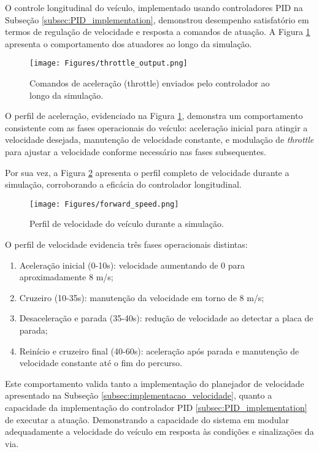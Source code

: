 O controle longitudinal do veículo, implementado usando controladores PID na Subseção \ref{subsec:PID_implementation}, demonstrou desempenho satisfatório em termos de regulação de velocidade e resposta a comandos de atuação. A Figura \ref{fig:throttle} apresenta o comportamento dos atuadores ao longo da simulação.

\begin{figure}[H]
\centering
\texttt{[image: Figures/throttle\_output.png]}
\caption{Comandos de aceleração (throttle) enviados pelo controlador ao longo da simulação.}
\label{fig:throttle}
\end{figure}

O perfil de aceleração, evidenciado na Figura \ref{fig:throttle}, demonstra um comportamento consistente com as fases operacionais do veículo: aceleração inicial para atingir a velocidade desejada, manutenção de velocidade constante, e modulação de \textit{throttle} para ajustar a velocidade conforme necessário nas fases subsequentes.

Por sua vez, a Figura \ref{fig:velocidade} apresenta o perfil completo de velocidade durante a simulação, corroborando a eficácia do controlador longitudinal.

\begin{figure}[H]
\centering
\texttt{[image: Figures/forward\_speed.png]}
\caption{Perfil de velocidade do veículo durante a simulação.}
\label{fig:velocidade}
\end{figure}

O perfil de velocidade evidencia três fases operacionais distintas:
\begin{enumerate}
    \item Aceleração inicial (0-10s): velocidade aumentando de 0 para aproximadamente 8 m/s;
    \item Cruzeiro (10-35s): manutenção da velocidade em torno de 8 m/s;
    \item Desaceleração e parada (35-40s): redução de velocidade ao detectar a placa de parada;
    \item Reinício e cruzeiro final (40-60s): aceleração após parada e manutenção de velocidade constante até o fim do percurso.
\end{enumerate}

Este comportamento valida tanto a implementação do planejador de velocidade apresentado na Subseção \ref{subsec:implementacao_velocidade}, quanto a capacidade da implementação do controlador PID \ref{subsec:PID_implementation} de executar a atuação. Demonstrando a capacidade do sistema em modular adequadamente a velocidade do veículo em resposta às condições e sinalizações da via.

